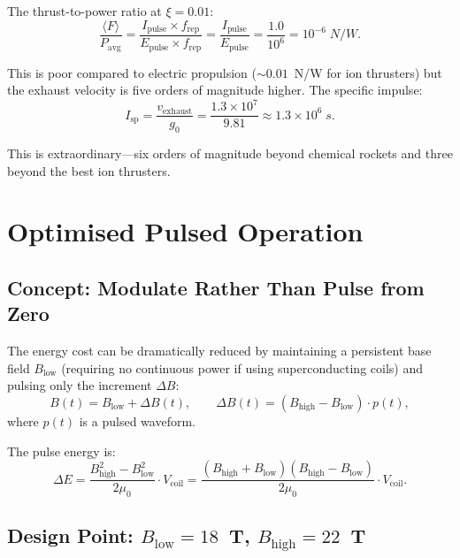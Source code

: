 \documentclass[amsmath,amssymb,aps,prd,superscriptaddress,nofootinbib]{revtex4-2}
\begin{document}
The thrust-to-power ratio at $\xi = 0.01$:
\begin{equation}
\frac{\langle F \rangle}{P_\text{avg}}
= \frac{I_\text{pulse} \times f_\text{rep}}{E_\text{pulse} \times f_\text{rep}}
= \frac{I_\text{pulse}}{E_\text{pulse}}
= \frac{1.0}{10^6}
= 10^{-6} \; \si{N/W}.
\end{equation}

This is poor compared to electric propulsion ($\sim 0.01$~N/W for
ion thrusters) but the exhaust velocity is five orders of magnitude
higher. The specific impulse:
\begin{equation}
I_\text{sp} = \frac{v_\text{exhaust}}{g_0}
= \frac{1.3 \times 10^7}{9.81}
\approx 1.3 \times 10^6 \; \si{s}.
\end{equation}

This is extraordinary---six orders of magnitude beyond chemical
rockets and three beyond the best ion thrusters.

\section{Optimised Pulsed Operation}\label{sec:optimised}

\subsection{Concept: Modulate Rather Than Pulse from Zero}

The energy cost can be dramatically reduced by maintaining a persistent
base field $B_\text{low}$ (requiring no continuous power if using
superconducting coils) and pulsing only the increment $\Delta B$:
\begin{equation}
B(t) = B_\text{low} + \Delta B(t), \qquad
\Delta B(t) = (B_\text{high} - B_\text{low}) \cdot p(t),
\end{equation}
where $p(t)$ is a pulsed waveform.

The pulse energy is:
\begin{equation}
\Delta E = \frac{B_\text{high}^2 - B_\text{low}^2}{2\mu_0} \cdot V_\text{coil}
= \frac{(B_\text{high} + B_\text{low})(B_\text{high} - B_\text{low})}{2\mu_0} \cdot V_\text{coil}.
\end{equation}

\subsection{Design Point: $B_\text{low} = 18$~T, $B_\text{high} = 22$~T}
\end{document}
